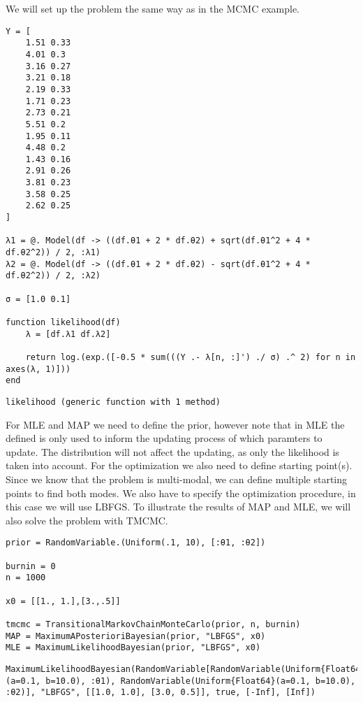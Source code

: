 We will set up the problem the same way as in the MCMC example.




\begin{verbatim}
Y = [
    1.51 0.33
    4.01 0.3
    3.16 0.27
    3.21 0.18
    2.19 0.33
    1.71 0.23
    2.73 0.21
    5.51 0.2
    1.95 0.11
    4.48 0.2
    1.43 0.16
    2.91 0.26
    3.81 0.23
    3.58 0.25
    2.62 0.25
]

λ1 = @. Model(df -> ((df.θ1 + 2 * df.θ2) + sqrt(df.θ1^2 + 4 * df.θ2^2)) / 2, :λ1)
λ2 = @. Model(df -> ((df.θ1 + 2 * df.θ2) - sqrt(df.θ1^2 + 4 * df.θ2^2)) / 2, :λ2)

σ = [1.0 0.1]

function likelihood(df)
    λ = [df.λ1 df.λ2]

    return log.(exp.([-0.5 * sum(((Y .- λ[n, :]') ./ σ) .^ 2) for n in axes(λ, 1)]))
end
\end{verbatim}


\begin{verbatim}
likelihood (generic function with 1 method)
\end{verbatim}



For MLE and MAP we need to define the prior, however note that in MLE the defined  is only used to inform the updating process of which paramters to update. The distribution will not affect the updating, as only the likelihood is taken into account. For the optimization we also need to define starting point(s). Since we know that the problem is multi-modal, we can define multiple starting points to find both modes. We also have to specify the optimization procedure, in this case we will use LBFGS. To illustrate the results of MAP and MLE, we will also solve the problem with TMCMC.




\begin{verbatim}
prior = RandomVariable.(Uniform(.1, 10), [:θ1, :θ2])

burnin = 0
n = 1000

x0 = [[1., 1.],[3.,.5]]

tmcmc = TransitionalMarkovChainMonteCarlo(prior, n, burnin)
MAP = MaximumAPosterioriBayesian(prior, "LBFGS", x0)
MLE = MaximumLikelihoodBayesian(prior, "LBFGS", x0)
\end{verbatim}


\begin{verbatim}
MaximumLikelihoodBayesian(RandomVariable[RandomVariable(Uniform{Float64}(a=0.1, b=10.0), :θ1), RandomVariable(Uniform{Float64}(a=0.1, b=10.0), :θ2)], "LBFGS", [[1.0, 1.0], [3.0, 0.5]], true, [-Inf], [Inf])
\end{verbatim}



